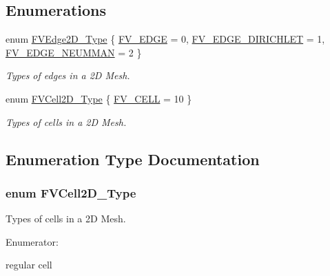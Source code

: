 \subsection*{Enumerations}
\begin{DoxyCompactItemize}
\item 
enum \hyperlink{namespaceFVL_a854be4189a88b254bfd8d4c4c0b1736f}{FVEdge2D\_\-Type} \{ \hyperlink{namespaceFVL_a854be4189a88b254bfd8d4c4c0b1736fa5dd138e0c6bccc410834fa09c422bf1a}{FV\_\-EDGE} =  0, 
\hyperlink{namespaceFVL_a854be4189a88b254bfd8d4c4c0b1736faa3d12995e6a8cbc18fe218a2f2639635}{FV\_\-EDGE\_\-DIRICHLET} =  1, 
\hyperlink{namespaceFVL_a854be4189a88b254bfd8d4c4c0b1736fa0d52d6dca00f75adf8ce66d13466b02d}{FV\_\-EDGE\_\-NEUMMAN} =  2
 \}
\begin{DoxyCompactList}\small\item\em Types of edges in a 2D Mesh. \item\end{DoxyCompactList}\item 
enum \hyperlink{namespaceFVL_ae01eed8067b17a985aa9c1f87956a6cd}{FVCell2D\_\-Type} \{ \hyperlink{namespaceFVL_ae01eed8067b17a985aa9c1f87956a6cda22b17c2dd52829f533777105d078f91e}{FV\_\-CELL} =  10
 \}
\begin{DoxyCompactList}\small\item\em Types of cells in a 2D Mesh. \item\end{DoxyCompactList}\end{DoxyCompactItemize}


\subsection{Enumeration Type Documentation}
\hypertarget{namespaceFVL_ae01eed8067b17a985aa9c1f87956a6cd}{
\subsubsection[{FVCell2D\_\-Type}]{\setlength{\rightskip}{0pt plus 5cm}enum {\bf FVCell2D\_\-Type}}}
\label{dd/d11/namespaceFVL_ae01eed8067b17a985aa9c1f87956a6cd}


Types of cells in a 2D Mesh. 

\begin{Desc}
\item[Enumerator: ]\par
\begin{description}
\item[{\em 
\hypertarget{namespaceFVL_ae01eed8067b17a985aa9c1f87956a6cda22b17c2dd52829f533777105d078f91e}{
FV\_\-CELL}
\label{dd/d11/namespaceFVL_ae01eed8067b17a985aa9c1f87956a6cda22b17c2dd52829f533777105d078f91e}
}]regular cell \end{description}
\end{Desc}

